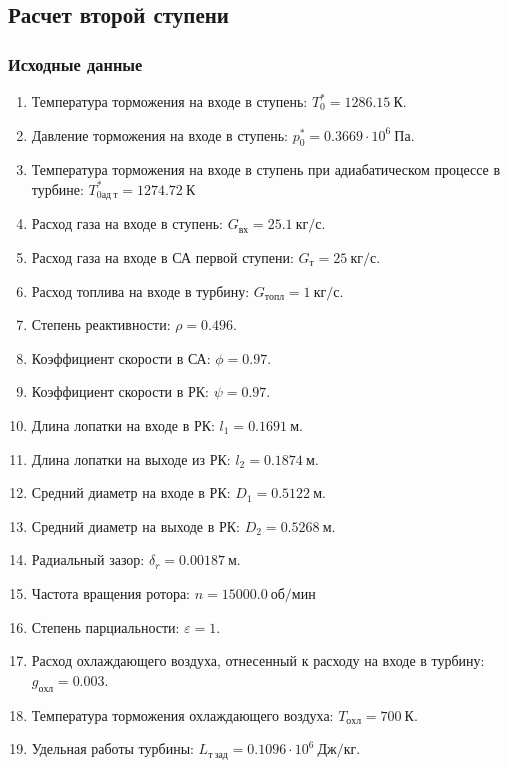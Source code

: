 \documentclass[a4paper,10pt]{article}
\begin{document}
    \subsection{Расчет второй ступени}

    \subsubsection{Исходные данные}

    
    \begin{enumerate}

        \item Температура торможения на входе в ступень: $T_0^* = 1286.15\ К $.
        \item Давление торможения на входе в ступень: $p_0^* = 0.3669 \cdot 10^6 \ Па$.
        \item Температура торможения на входе в ступень при адиабатическом процессе в турбине: $T_{0ад\ т}^* = 1274.72\ К$
        \item Расход газа на входе в ступень: $G_{вх} = 25.1\ кг/с$.
        \item Расход газа на входе в СА первой ступени: $ G_т = 25\ кг/с $.
        \item Расход топлива на входе в турбину: $ G_{топл} = 1\ кг/с $.
        \item Степень реактивности: $ \rho = 0.496 $.
        \item Коэффициент скорости в СА: $ \phi = 0.97 $.
        \item Коэффициент скорости в РК: $ \psi = 0.97 $.
        \item Длина лопатки на входе в РК: $ l_1 = 0.1691\ м $.
        \item Длина лопатки на выходе из РК: $ l_2 = 0.1874\ м $.
        \item Средний диаметр на входе в РК: $ D_1 = 0.5122\ м $.
        \item Средний диаметр на выходе в РК: $ D_2 = 0.5268\ м $.
        \item Радиальный зазор: $ \delta_r = 0.00187\ м $.
        \item Частота вращения ротора: $ n = 15000.0\ об/мин $
        \item Степень парциальности: $ \varepsilon = 1 $.
        \item Расход охлаждающего воздуха, отнесенный к расходу на входе в турбину: $ g_{охл} = 0.003 $.
        \item Температура торможения охлаждающего воздуха: $ T_{охл} = 700\ К $.

        
        \item Удельная работы турбины: $ L_{т\ зад} = 0.1096 \cdot 10^6 \ Дж/кг $.

        

    \end{enumerate}
    
\end{document}
